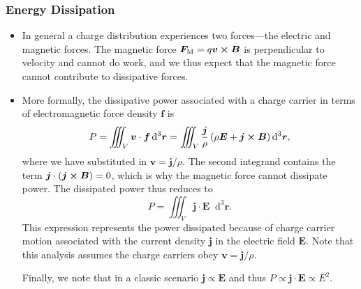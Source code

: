 \documentclass[11pt, a4paper]{article}
\newcommand{\diff}{\mathop{}\!\mathrm{d}} %
\newcommand{\dr}{\diff^{3} \r}  %
\renewcommand{\vec}[1]{\bm{#1}} %
\renewcommand{\r}{\vec{r}}
\newcommand{\E}{\vec{E}} %
\newcommand{\B}{\vec{B}} %
\renewcommand{\j}{\vec{j}}  %
\begin{document}
\subsubsection{Energy Dissipation}
\begin{itemize}
    \item In general a charge distribution experiences two forces---the electric and magnetic forces. The magnetic force $ \vec{F}_{\text{M}} = q \vec{v} \cross \B  $ is perpendicular to velocity and cannot do work, and we thus expect that the magnetic force cannot contribute to dissipative forces. 
	
	\item More formally, the dissipative power associated with a charge carrier in terms of electromagnetic force density $ \vec{f} $ is
	\begin{equation*}
		P = \iiint_{V} \vec{v} \cdot \vec{f} \dr = \iiint_{V} \frac{\j}{\rho} \left(\rho \E + \j \cross \B\right)\dr,
	\end{equation*}
	where we have substituted in $ \vec{v} = \j/\rho $. The second integrand contains the term $ \j \cdot (\j \cross \B) = 0 $, which is why the magnetic force cannot dissipate power. The dissipated power thus reduces to
	\begin{equation*}
		P = \iiint_{V} \j \cdot \E \dr.
	\end{equation*}
	This expression represents the power dissipated because of charge carrier motion associated with the current density $ \j $ in the electric field $ \E $. Note that this analysis assumes the charge carriers obey $ \vec{v} = \j / \rho $. 
	
    Finally, we note that in a classic scenario $ \j \propto \E $ and thus $ P \propto \j \cdot \E \propto E^{2} $. 
		
\end{itemize}
\end{document}
